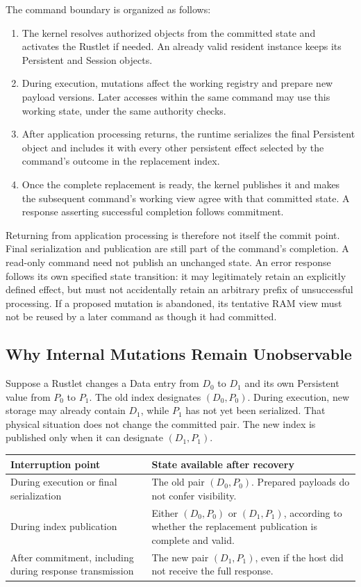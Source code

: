 The command boundary is organized as follows:
\begin{enumerate}
\item The kernel resolves authorized objects from the committed state and
  activates the Rustlet if needed. An already valid resident instance keeps
  its Persistent and Session objects.
\item During execution, mutations affect the working registry and prepare new
  payload versions. Later accesses within the same command may use this
  working state, under the same authority checks.
\item After application processing returns, the runtime serializes the final
  Persistent object and includes it with every other persistent effect selected
  by the command's outcome in the replacement index.
\item Once the complete replacement is ready, the kernel publishes it and
  makes the subsequent command's working view agree with that committed
  state. A response asserting successful completion follows commitment.
\end{enumerate}

Returning from application processing is therefore not itself the commit
point. Final serialization and publication are still part of the command's
completion. A read-only command need not publish an unchanged state. An error
response follows its own specified state transition: it may legitimately
retain an explicitly defined effect, but must not accidentally retain an
arbitrary prefix of unsuccessful processing. If a proposed mutation is
abandoned, its tentative RAM view must not be reused by a later command as
though it had committed.

\subsection{Why Internal Mutations Remain Unobservable}

Suppose a Rustlet changes a Data entry from $D_0$ to $D_1$ and its own
Persistent value from $P_0$ to $P_1$. The old index designates $(D_0,P_0)$.
During execution, new storage may already contain $D_1$, while $P_1$ has not
yet been serialized. That physical situation does not change the committed
pair. The new index is published only when it can designate $(D_1,P_1)$.

\begin{center}
\begin{tabular}{|p{5.8cm}|p{7cm}|}
\hline
\textbf{Interruption point} & \textbf{State available after recovery} \\
\hline
During execution or final serialization &
The old pair $(D_0,P_0)$. Prepared payloads do not confer visibility. \\
\hline
During index publication &
Either $(D_0,P_0)$ or $(D_1,P_1)$, according to whether the replacement
publication is complete and valid. \\
\hline
After commitment, including during response transmission &
The new pair $(D_1,P_1)$, even if the host did not receive the full response. \\
\hline
\end{tabular}
\end{center}

